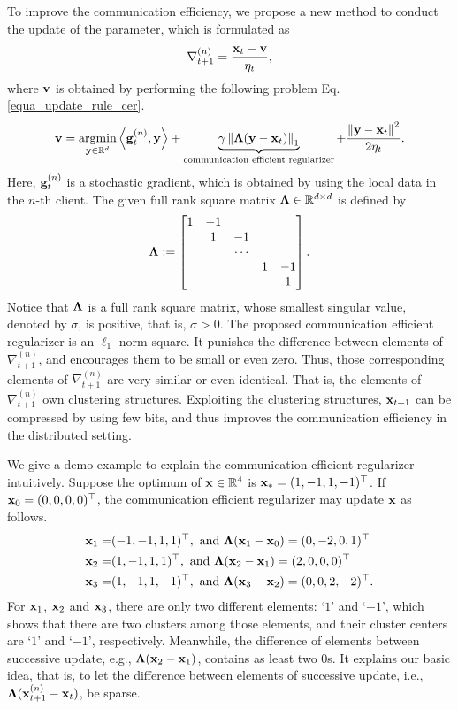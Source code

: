 \documentclass[journal]{IEEEtran}
\begin{document}
To improve the communication efficiency, we propose a new method to conduct the update of the parameter, which is formulated as
\begin{align}
\nonumber
\nabla_{t+1}^{(n)} = \frac{{\bf x}_t - {\bf v}}{\eta_t}, 
\end{align} where ${\bf v}$ is obtained by performing the following problem Eq. \ref{equa_update_rule_cer}.
\begin{align}
\label{equa_update_rule_cer}
\v = \argmin_{\y\in\RR^d} \lrangle {\g^{(n)}_t, \y} + \underbrace{\gamma \lrnorm{\bLambda(\y - \x_t)}_1}_{\text{communication efficient regularizer}} + \frac{\lrnorm{\y - \x_t}^2}{2\eta_t}. 
\end{align}  Here, ${\bf g}^{(n)}_t$ is a stochastic gradient, which is obtained by using the local data in the $n$-th client. The given full rank square matrix $\mathbf{\Lambda}\in\mathbb{R}^{d\times d}$ is defined by
\begin{align}
\nonumber
\mathbf{\Lambda} := \begin{bmatrix}
 1&  -1&  &  & \\ 
 &  1&  -1&  & \\ 
 &  &   \cdots &  & \\ 
 &  &  & 1 & -1 \\ 
 &  &  &  & 1
\end{bmatrix}.
\end{align} Notice that $\mathbf{\Lambda}$ is a full rank square matrix, whose smallest singular value, denoted by $\sigma$,  is positive, that is, $\sigma > 0$. The proposed communication efficient regularizer is an $\ell_1$ norm square. It punishes the difference between elements of $\nabla_{t+1}^{(n)}$, and encourages them  to be small or even zero. Thus, those corresponding elements of $\nabla_{t+1}^{(n)}$ are very similar or even identical. That is, the elements of $\nabla_{t+1}^{(n)}$ own clustering structures. Exploiting the clustering structures, ${\bf x}_{t+1}$ can be compressed by using few bits, and thus improves the communication efficiency in the distributed setting.

We give a demo example to explain the communication efficient regularizer intuitively. Suppose the optimum of ${\bf x}\in\mathbb{R}^4$ is ${\bf x}_{\ast} = (1, -1, 1, -1)^{\top}$. If ${\bf x}_0 = (0,0,0,0)^{\top}$, the communication efficient regularizer may update ${\bf x}$ as follows.
\begin{align}
\nonumber
{\bf x}_1 = & (-1,-1,1,1)^{\top}, \text{ and } \mathbf{\Lambda}({\bf x}_1-{\bf x}_0)= (0,-2,0,1)^{\top} \\ \nonumber
{\bf x}_2 = & (1,-1,1,1)^{\top}, \text{ and } \mathbf{\Lambda}({\bf x}_2-{\bf x}_1) = (2,0,0,0)^{\top} \\ \nonumber
{\bf x}_3 = & (1,-1,1,-1)^{\top}, \text{ and } \mathbf{\Lambda}({\bf x}_3-{\bf x}_2) = (0,0,2,-2)^{\top}.
\end{align} For ${\bf x}_1$, ${\bf x}_2$ and ${\bf x}_3$, there are only two different elements: `$1$' and `$-1$', which shows that there are two clusters among those elements, and their cluster centers are `$1$' and `$-1$', respectively. Meanwhile, the difference of elements between successive update, e.g., $\mathbf{\Lambda}({\bf x}_2-{\bf x}_1)$, contains as least two $0$s. It explains our basic idea, that is, to let the difference between elements of successive update, i.e., $\mathbf{\Lambda}({\bf x}^{(n)}_{t+1}-{\bf x}_t)$, be sparse. 
 
\end{document}
